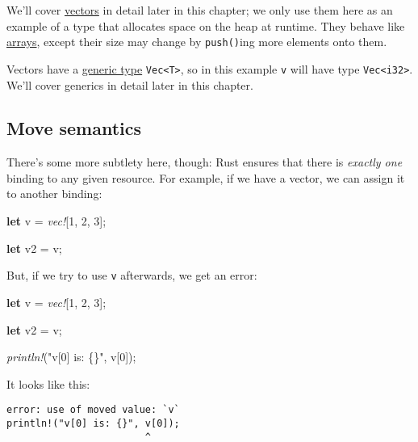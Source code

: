\documentclass[a4paper,]{book}
\newenvironment{Shaded}{\begin{snugshade}}{\end{snugshade}}
\newcommand{\KeywordTok}[1]{\textcolor[rgb]{0.13,0.29,0.53}{\textbf{{#1}}}}
\newcommand{\DecValTok}[1]{\textcolor[rgb]{0.00,0.00,0.81}{{#1}}}
\newcommand{\StringTok}[1]{\textcolor[rgb]{0.31,0.60,0.02}{{#1}}}
\newcommand{\PreprocessorTok}[1]{\textcolor[rgb]{0.56,0.35,0.01}{\textit{{#1}}}}
\newcommand{\NormalTok}[1]{{#1}}
\begin{document}
We'll cover \protect\hyperlink{sec--vectors}{vectors} in detail later in
this chapter; we only use them here as an example of a type that
allocates space on the heap at runtime. They behave like
\protect\hyperlink{arrays}{arrays}, except their size may change by
\texttt{push()}ing more elements onto them.

Vectors have a \protect\hyperlink{sec--generics}{generic type}
\texttt{Vec\textless{}T\textgreater{}}, so in this example \texttt{v}
will have type \texttt{Vec\textless{}i32\textgreater{}}. We'll cover
generics in detail later in this chapter.

\subsection{Move semantics}\label{move-semantics}

There's some more subtlety here, though: Rust ensures that there is
\emph{exactly one} binding to any given resource. For example, if we
have a vector, we can assign it to another binding:

\begin{Shaded}
\begin{Highlighting}[]
\KeywordTok{let} \NormalTok{v = }\PreprocessorTok{vec!}\NormalTok{[}\DecValTok{1}\NormalTok{, }\DecValTok{2}\NormalTok{, }\DecValTok{3}\NormalTok{];}

\KeywordTok{let} \NormalTok{v2 = v;}
\end{Highlighting}
\end{Shaded}

But, if we try to use \texttt{v} afterwards, we get an error:

\begin{Shaded}
\begin{Highlighting}[]
\KeywordTok{let} \NormalTok{v = }\PreprocessorTok{vec!}\NormalTok{[}\DecValTok{1}\NormalTok{, }\DecValTok{2}\NormalTok{, }\DecValTok{3}\NormalTok{];}

\KeywordTok{let} \NormalTok{v2 = v;}

\PreprocessorTok{println!}\NormalTok{(}\StringTok{"v[0] is: \{\}"}\NormalTok{, v[}\DecValTok{0}\NormalTok{]);}
\end{Highlighting}
\end{Shaded}

It looks like this:

\begin{verbatim}
error: use of moved value: `v`
println!("v[0] is: {}", v[0]);
                        ^
\end{verbatim}
\end{document}
